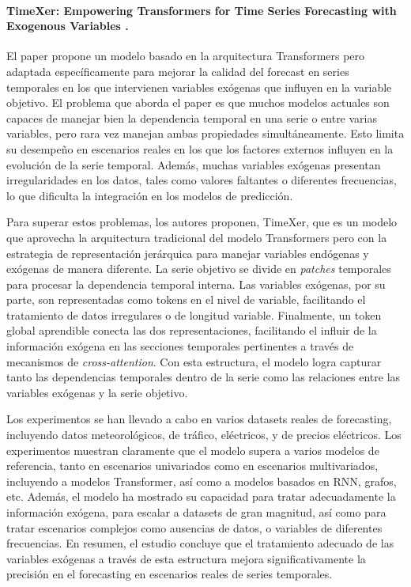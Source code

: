 \documentclass{article}
\begin{document}
\paragraph{TimeXer: Empowering Transformers for Time Series Forecasting with Exogenous Variables \citep{wang2024timexer}.}
El paper propone un modelo basado en la arquitectura Transformers pero adaptada específicamente para mejorar la calidad del forecast en series temporales en los que intervienen variables exógenas que influyen en la variable objetivo. El problema que aborda el paper es que muchos modelos actuales son capaces de manejar bien la dependencia temporal en una serie o entre varias variables, pero rara vez manejan ambas propiedades simultáneamente. Esto limita su desempeño en escenarios reales en los que los factores externos influyen en la evolución de la serie temporal. Además, muchas variables exógenas presentan irregularidades en los datos, tales como valores faltantes o diferentes frecuencias, lo que dificulta la integración en los modelos de predicción.

Para superar estos problemas, los autores proponen, TimeXer, que es un modelo que aprovecha la arquitectura tradicional del modelo Transformers pero con la estrategia de representación jerárquica para manejar variables endógenas y exógenas de manera diferente. La serie objetivo se divide en \textit{patches} temporales para procesar la dependencia temporal interna. Las variables exógenas, por su parte, son representadas como tokens en el nivel de variable, facilitando el tratamiento de datos irregulares o de longitud variable. Finalmente, un token global aprendible conecta las dos representaciones, facilitando el influir de la información exógena en las secciones temporales pertinentes a través de mecanismos de \textit{cross-attention}. Con esta estructura, el modelo logra capturar tanto las dependencias temporales dentro de la serie como las relaciones entre las variables exógenas y la serie objetivo.

Los experimentos se han llevado a cabo en varios datasets reales de forecasting, incluyendo datos meteorológicos, de tráfico, eléctricos, y de precios eléctricos. Los experimentos muestran claramente que el modelo supera a varios modelos de referencia, tanto en escenarios univariados como en escenarios multivariados, incluyendo a modelos Transformer, así como a modelos basados en RNN, grafos, etc. Además, el modelo ha mostrado su capacidad para tratar adecuadamente la información exógena, para escalar a datasets de gran magnitud, así como para tratar escenarios complejos como ausencias de datos, o variables de diferentes frecuencias. En resumen, el estudio concluye que el tratamiento adecuado de las variables exógenas a través de esta estructura mejora significativamente la precisión en el forecasting en escenarios reales de series temporales.
\end{document}
